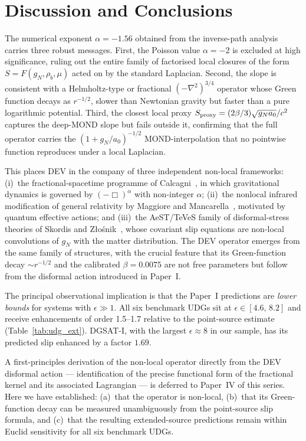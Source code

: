 \documentclass[aps,prd,twocolumn,superscriptaddress,nofootinbib]{revtex4-2}
\newcommand{\aO}{a_0}
\begin{document}
\section{Discussion and Conclusions}
\label{sec:discuss}

The numerical exponent $\alpha = -1.56$ obtained from the
inverse-path analysis carries three robust messages.
First, the Poisson value $\alpha = -2$ is excluded at high
significance, ruling out the entire family of factorised
local closures of the form $S = F(g_N,\rho_b,\mu)$ acted
on by the standard Laplacian. Second, the slope is
consistent with a Helmholtz-type or fractional
$(-\nabla^2)^{3/4}$ operator whose Green function decays
as $r^{-1/2}$, slower than Newtonian gravity but faster
than a pure logarithmic potential. Third, the closest
local proxy $S_{\rm proxy}=(2\beta/3)\sqrt{g_N\aO}/c^2$
captures the deep-MOND slope but fails outside it,
confirming that the full operator carries the
$(1+g_N/\aO)^{-1/2}$ MOND-interpolation that no pointwise
function reproduces under a local Laplacian.

This places DEV in the company of three independent
non-local frameworks: (i)~the fractional-spacetime
programme of Calcagni~\cite{Calcagni2021}, in which
gravitational dynamics is governed by $(-\Box)^\alpha$
with non-integer $\alpha$;
(ii)~the nonlocal infrared modification of general
relativity by Maggiore and
Mancarella~\cite{MaggioreMancarella2014},
motivated by quantum effective actions; and (iii)~the
AeST/TeVeS family of disformal-stress theories of
Skordis and Z\l{}o\'snik~\cite{Skordis2021},
whose covariant slip equations are non-local convolutions
of $g_N$ with the matter distribution. The DEV operator
emerges from the same family of structures, with the
crucial feature that its Green-function decay
$\sim r^{-1/2}$ and the calibrated $\beta = 0.0075$ are
not free parameters but follow from the disformal action
introduced in Paper~I.

The principal observational implication is that the
Paper~I predictions are \emph{lower bounds} for systems
with $\epsilon \gg 1$. All six benchmark UDGs sit at
$\epsilon \in [4.6,\,8.2]$ and receive enhancements of
order 1.5--1.7 relative to the point-source estimate
(Table~\ref{tab:udg_ext}). DGSAT-I, with the largest
$\epsilon \approx 8$ in our sample, has its predicted
slip enhanced by a factor $1.69$.

A first-principles derivation of the non-local operator
directly from the DEV disformal action --- identification
of the precise functional form of the fractional kernel
and its associated Lagrangian --- is deferred to Paper~IV
of this series. Here we have established: (a)~that the
operator is non-local, (b)~that its Green-function decay
can be measured unambiguously from the point-source slip
formula, and (c)~that the resulting extended-source
predictions remain within Euclid sensitivity for all six
benchmark UDGs.
\end{document}

